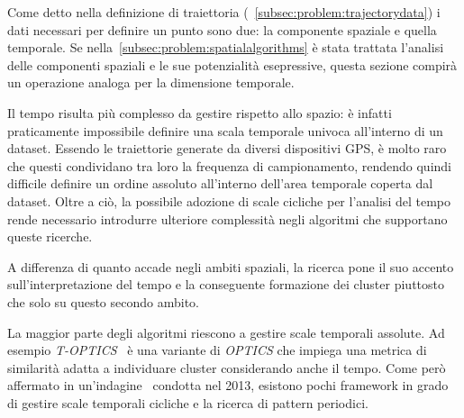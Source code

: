 Come detto nella definizione di traiettoria (~\cref*{subsec:problem:trajectorydata})
i dati necessari per definire un punto sono due: la componente spaziale e quella temporale.
Se nella~\cref*{subsec:problem:spatialalgorithms} è stata trattata l'analisi delle componenti
spaziali e le sue potenzialità esepressive, questa sezione compirà un operazione analoga per la
dimensione temporale.

Il tempo risulta più complesso da gestire rispetto allo spazio: è infatti praticamente impossibile
definire una scala temporale univoca all'interno di un dataset.
Essendo le traiettorie generate da diversi dispositivi GPS, è molto raro che questi condividano tra loro la frequenza
di campionamento, rendendo quindi difficile definire un ordine assoluto all'interno dell'area temporale
coperta dal dataset.
Oltre a ciò, la possibile adozione di scale cicliche per l'analisi del tempo rende necessario
introdurre ulteriore complessità negli algoritmi che supportano queste ricerche.

A differenza di quanto accade negli ambiti spaziali, la ricerca pone il suo accento
sull'interpretazione del tempo e la conseguente formazione dei cluster piuttosto che
solo su questo secondo ambito.

La maggior parte degli algoritmi riescono a gestire scale temporali assolute. Ad esempio
\textit{T-OPTICS}~\cite{nanni2006time} è una variante di \textit{OPTICS} che impiega una metrica di similarità
adatta a individuare cluster considerando anche il tempo.
Come però affermato in un'indagine~\cite{mitsch2013survey} condotta nel 2013, esistono pochi framework in grado di gestire
scale temporali cicliche e la ricerca di pattern periodici.
